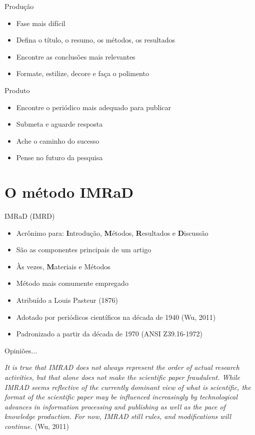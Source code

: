\begin{frame}{Produção}
\begin{itemize}
\item Fase mais difícil
\item Defina o título, o resumo, os métodos, os resultados 
\item Encontre as conclusões mais relevantes
\item Formate, estilize, decore e faça o polimento
\end{itemize}
\end{frame}


\begin{frame}{Produto}
\begin{itemize}
\item Encontre o periódico mais adequado para publicar
\item Submeta e aguarde resposta
\item Ache o caminho do sucesso
\item Pense no futuro da pesquisa
\end{itemize}
\end{frame}

\section{O método IMRaD}

\begin{frame}{IMRaD (IMRD)}
\begin{itemize}
\item Acrônimo para: \textbf{I}ntrodução, \textbf{M}étodos, \textbf{R}esultados e \textbf{D}iscussão
\item São as componentes principais de um artigo
\item Às vezes, \textbf{M}ateriais e Métodos
\item Método mais comumente empregado
\item Atribuído a Louis Pasteur (1876) 
\item Adotado por periódicos científicos na década de 1940 (Wu, 2011)
\item Padronizado a partir da década de 1970 (ANSI Z39.16-1972)
\end{itemize}
\end{frame}

\begin{frame}{Opiniões...}
\begin{block}
\scriptsize{\emph{It is true that IMRAD does not always represent the order of actual research activities, but that alone does not make the scientific paper fraudulent. While IMRAD seems reflective of the currently dominant view of what is scientific, the format of the scientific paper may be influenced increasingly by technological advances in information processing and publishing as well as the pace of knowledge production. For now, IMRAD still rules, and modifications will continue.} (Wu, 2011)}
\end{block}
\end{frame}

